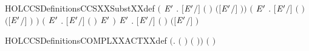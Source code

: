 \begin{SaveVerbatim}{HOLCCSDefinitionsCCSXXSubstXXdef}
   \ensuremath{(}\HOLSymConst{\HOLTokenForall{}}  \ensuremath{\HOLBoundVar{E}\sp{\prime}} . \ensuremath{[}\ensuremath{\HOLBoundVar{E}\sp{\prime}}\ensuremath{/}\ensuremath{]} \ensuremath{(}  \ensuremath{)} \HOLSymConst{\ensuremath{=}}   \ensuremath{(}\ensuremath{[}\ensuremath{\HOLBoundVar{E}\sp{\prime}}\ensuremath{/}\ensuremath{]} \ensuremath{)}\ensuremath{)} \HOLSymConst{\HOLTokenConj{}}
   \ensuremath{(}\HOLSymConst{\HOLTokenForall{}}  \ensuremath{\HOLBoundVar{E}\sp{\prime}} . \ensuremath{[}\ensuremath{\HOLBoundVar{E}\sp{\prime}}\ensuremath{/}\ensuremath{]} \ensuremath{(}  \ensuremath{)} \HOLSymConst{\ensuremath{=}}  \ensuremath{(}\ensuremath{[}\ensuremath{\HOLBoundVar{E}\sp{\prime}}\ensuremath{/}\ensuremath{]} \ensuremath{)} \ensuremath{)} \HOLSymConst{\HOLTokenConj{}}
   \ensuremath{(}\HOLSymConst{\HOLTokenForall{}} \ensuremath{\HOLBoundVar{E}\sp{\prime}} . \ensuremath{[}\ensuremath{\HOLBoundVar{E}\sp{\prime}}\ensuremath{/}\ensuremath{]} \ensuremath{(} \ensuremath{)} \HOLSymConst{\ensuremath{=}}   \HOLSymConst{\ensuremath{=}}   \ensuremath{\HOLBoundVar{E}\sp{\prime}}   \ensuremath{)} \HOLSymConst{\HOLTokenConj{}}
   \HOLSymConst{\HOLTokenForall{}}  \ensuremath{\HOLBoundVar{E}\sp{\prime}} .
       \ensuremath{[}\ensuremath{\HOLBoundVar{E}\sp{\prime}}\ensuremath{/}\ensuremath{]} \ensuremath{(}  \ensuremath{)} \HOLSymConst{\ensuremath{=}}
         \HOLSymConst{\ensuremath{=}}         \ensuremath{(}\ensuremath{[}\ensuremath{\HOLBoundVar{E}\sp{\prime}}\ensuremath{/}\ensuremath{]} \ensuremath{)}
\end{SaveVerbatim}
\newcommand{\HOLCCSDefinitionsCCSXXSubstXXdef}{\UseVerbatim{HOLCCSDefinitionsCCSXXSubstXXdef}}
\begin{SaveVerbatim}{HOLCCSDefinitionsCOMPLXXACTXXdef}
\HOLTokenTurnstile{} \ensuremath{(}\HOLSymConst{\HOLTokenForall{}}.  \ensuremath{(} \ensuremath{)} \HOLSymConst{\ensuremath{=}}  \ensuremath{(} \ensuremath{)}\ensuremath{)} \HOLSymConst{\HOLTokenConj{}} \ensuremath{(} \HOLConst{\ensuremath{\tau}} \HOLSymConst{\ensuremath{=}} \HOLConst{\ensuremath{\tau}}\ensuremath{)}
\end{SaveVerbatim}

